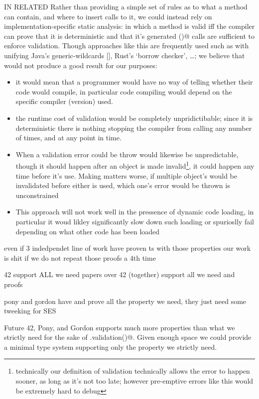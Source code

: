 IN RELATED
Rather than providing a simple set of rules as to what a \Q@validate@ method can contain, and where to insert calls to it, we could instead rely on implementation-specific static analysis: in which a \Q@validate@ method is valid iff the compiler can prove that it is deterministic and that it’s generated \Q@validate()@ calls are sufficient to enforce validation. Though approaches like this are frequently used such as with unifying Java’s generic-wildcards [], Rust’s ‘borrow checker’, …; we believe that would not produce a good result for our purposes: 
\begin{itemize}
	\item it would mean that a programmer would have no way of telling whether their code would compile, in particular code compiling would depend on the specific compiler (version) used.
	\item the runtime cost of validation would be completely unpridictibable; since it is deterministic there is nothing stopping the compiler from calling \Q@validate@ any number of times, and at any point in time.
	\item When a validation error could be throw would likewise be unpredictable, though it should happen after an object is made invalid\footnote{technically our definition of validation technically allows the error to happen sooner, as long as it’s not too late; however pre-emptive errors like this would be extremely hard to debug}, it could happen any time before it’s use. Making matters worse, if multiple object’s would be invalidated before either is used, which one’s error would be thrown is unconstrained
	\item This approach will not work well in the pressence of dynamic code loading, in particular it woud likley significantly slow down such loading or spurioslly fail depending on what other code has been loaded
\end{itemize}

even if 3 indedpendet line of work have proven ts with those properties
our work is shit if we do not repeat those proofs a 4th time

42 support ALL we need
  papers over 42 (together) support all we need and proofs
  
pony and gordon
  have and prove all the property we need, they just need some tweeking for SES




Future
42, Pony, and Gordon supports much more properties than what we strictly need for the sake of \Q@.validation()@.
Given enough space we could provide a minimal type system supporting only the property we strictly need.


